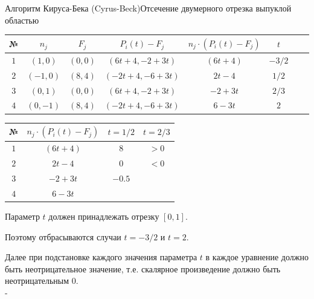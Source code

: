 \documentclass{beamer}
\begin{document}
\begin{frame}{Алгоритм Кируса-Бека (Cyrus-Beck)}{Отсечение двумерного отрезка выпуклой областью}
{	\begin{table}
		\begin{center}
			\begin{tabular}{|c|c|c|c|c|c|c|c|}
				\hline
				№ & $n_j$ & $F_j$ & $P_i(t) - F_j$ & $n_j \cdot (P_i(t) - F_j)$ & $t$ \\
				\hline
				$1$ & $(1,0)$ & $(0,0)$ &$(6t+4, -2+3t)$ & $(6t+4)$ & $-3/2$ \\
				\hline
				$2$ & $(-1,0)$ & $(8,4)$ & $(-2t+4, -6+3t)$ & $2t-4$ & $1/2$ \\
				\hline
				$3$ & $(0,1)$ & $(0,0)$ & $(6t+4, -2+3t)$ & $-2+3t$ & $2/3$ \\
				\hline
				$4$ & $(0,-1)$ & $(8,4)$ & $(-2t+4, -6+3t)$ & $6-3t$ & $2$ \\
				\hline
			\end{tabular}
		\end{center}
	\end{table}

	\begin{table}
		\begin{center}
			\begin{tabular}{|c|c|c|c|}
				\hline
				№ & $n_j \cdot (P_i(t) - F_j)$ & $t = 1/2$ & $ t = 2/3 $ \\
				\hline
				$1$ & $(6t+4)$ & $8$ & $>0$ \\
				\hline
				$2$ & $2t-4$ & $0$ & $<0$ \\
				\hline
				$3$ & $-2+3t$ & $-0.5$ & \\
				\hline
				$4$ & $6-3t$ & &  \\
				\hline
			\end{tabular}
		\end{center}
	\end{table}

	\footnotesize
	Параметр $t$ должен принадлежать отрезку $[0,1]$.
	
	Поэтому отбрасываются случаи $t = -3/2$ и $t = 2$.

	Далее при подстановке каждого значения параметра $t$ в каждое уравнение должно быть неотрицательное значение, т.е. скалярное произведение должно быть неотрицательным $0$.
	\\
	-
}
\end{frame}
\end{document}
